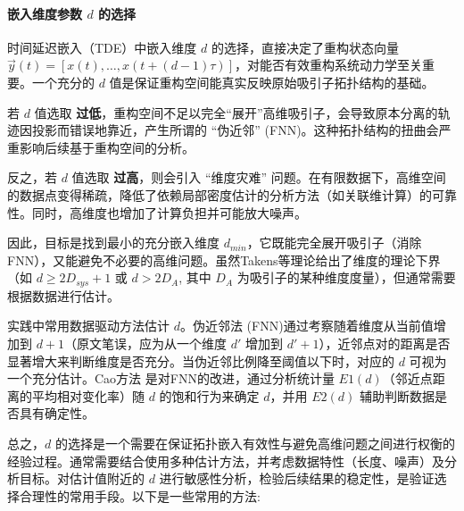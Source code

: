 \paragraph{嵌入维度参数 $d$ 的选择} %
时间延迟嵌入（TDE）中嵌入维度 $d$ 的选择，直接决定了重构状态向量 $\vec{y}(t) = [x(t), \dots, x(t+(d-1)\tau)]$，对能否有效重构系统动力学至关重要。一个充分的 $d$ 值是保证重构空间能真实反映原始吸引子拓扑结构的基础。

若 $d$ 值选取 \textbf{过低}，重构空间不足以完全“展开”高维吸引子，会导致原本分离的轨迹因投影而错误地靠近，产生所谓的 “伪近邻” (FNN)。这种拓扑结构的扭曲会严重影响后续基于重构空间的分析。

反之，若 $d$ 值选取 \textbf{过高}，则会引入 “维度灾难” 问题。在有限数据下，高维空间的数据点变得稀疏，降低了依赖局部密度估计的分析方法（如关联维计算）的可靠性。同时，高维度也增加了计算负担并可能放大噪声。

因此，目标是找到最小的充分嵌入维度 $d_{min}$，它既能完全展开吸引子（消除FNN），又能避免不必要的高维问题。虽然Takens等理论给出了维度的理论下界（如 $d \ge 2D_{sys}+1$ 或 $d > 2D_A$, 其中 $D_A$ 为吸引子的某种维度度量），但通常需要根据数据进行估计。

实践中常用数据驱动方法估计 $d$。伪近邻法 (FNN)\cite{rhodes1997false}通过考察随着维度从当前值增加到 $d+1$（原文笔误，应为从一个维度 $d'$ 增加到 $d'+1$），近邻点对的距离是否显著增大来判断维度是否充分。当伪近邻比例降至阈值以下时，对应的 $d$ 可视为一个充分估计。Cao方法\cite{cao1997practical} 是对FNN的改进，通过分析统计量 $E1(d)$（邻近点距离的平均相对变化率）随 $d$ 的饱和行为来确定 $d$，并用 $E2(d)$ 辅助判断数据是否具有确定性。

总之，$d$ 的选择是一个需要在保证拓扑嵌入有效性与避免高维问题之间进行权衡的经验过程。通常需要结合使用多种估计方法，并考虑数据特性（长度、噪声）及分析目标。对估计值附近的 $d$ 进行敏感性分析，检验后续结果的稳定性，是验证选择合理性的常用手段。以下是一些常用的方法:



